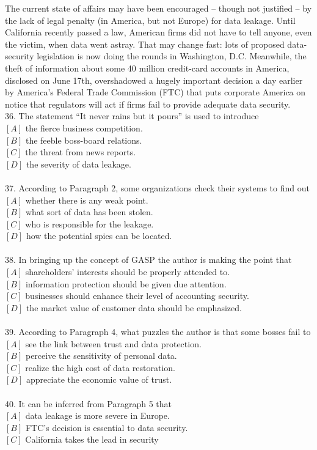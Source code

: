 \documentclass[a4paper]{article}
\begin{document}
\par
The current state of affairs may have been encouraged – though not justified – by the lack of legal penalty (in America, but not Europe) for data leakage. Until California recently passed a law, American firms did not have to tell anyone, even the victim, when data went astray. That may change fast: lots of proposed data-security legislation is now doing the rounds in Washington, D.C. Meanwhile, the theft of information about some 40 million credit-card accounts in America, disclosed on June 17th, overshadowed a hugely important decision a day earlier by America’s Federal Trade Commission (FTC) that puts corporate America on notice that regulators will act if firms fail to provide adequate data security.
\\36.	The statement “It never rains but it pours” is used to introduce\\$[A]$ the fierce business competition.\\$[B]$ the feeble boss-board relations.\\$[C]$ the threat from news reports.\\$[D]$ the severity of data leakage.\\\\37.	According to Paragraph 2, some organizations check their systems to find out\\$[A]$ whether there is any weak point.\\$[B]$ what sort of data has been stolen.\\$[C]$ who is responsible for the leakage.\\$[D]$ how the potential spies can be located.\\\\38.	In bringing up the concept of GASP the author is making the point that\\$[A]$ shareholders’ interests should be properly attended to.\\$[B]$ information protection should be given due attention.\\$[C]$ businesses should enhance their level of accounting security.\\$[D]$ the market value of customer data should be emphasized.\\\\39.	According to Paragraph 4, what puzzles the author is that some bosses fail to\\$[A]$ see the link between trust and data protection.\\$[B]$ perceive the sensitivity of personal data.\\$[C]$ realize the high cost of data restoration.\\$[D]$ appreciate the economic value of trust.\\\\40.	It can be inferred from Paragraph 5 that\\$[A]$ data leakage is more severe in Europe.\\$[B]$ FTC’s decision is essential to data security.\\$[C]$ California takes the lead in security 
\end{document}
